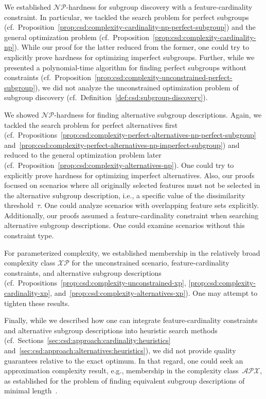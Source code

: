 \documentclass{article}
\theoremstyle{definition}
\begin{document}
We established $\mathcal{NP}$-hardness for subgroup discovery with a feature-cardinality constraint.
In particular, we tackled the search problem for perfect subgroups (cf.~Proposition~\ref{prop:csd:complexity-cardinality-np-perfect-subgroup}) and the general optimization problem (cf.~Proposition~\ref{prop:csd:complexity-cardinality-np}).
While our proof for the latter reduced from the former, one could try to explicitly prove hardness for optimizing imperfect subgroups.
Further, while we presented a polynomial-time algorithm for finding perfect subgroups without constraints (cf.~Proposition~\ref{prop:csd:complexity-unconstrained-perfect-subgroup}), we did not analyze the unconstrained optimization problem of subgroup discovery (cf.~Definition~\ref{def:csd:subgroup-discovery}).

We showed $\mathcal{NP}$-hardness for finding alternative subgroup descriptions.
Again, we tackled the search problem for perfect alternatives first (cf.~Propositions~\ref{prop:csd:complexity-perfect-alternatives-np-perfect-subgroup} and~\ref{prop:csd:complexity-perfect-alternatives-np-imperfect-subgroup}) and reduced to the general optimization problem later (cf.~Proposition~\ref{prop:csd:complexity-alternatives-np}).
One could try to explicitly prove hardness for optimizing imperfect alternatives.
Also, our proofs focused on scenarios where all originally selected features must not be selected in the alternative subgroup description, i.e., a specific value of the dissimilarity threshold~$\tau$.
One could analyze scenarios with overlapping feature sets explicitly.
Additionally, our proofs assumed a feature-cardinality constraint when searching alternative subgroup descriptions.
One could examine scenarios without this constraint type.

For parameterized complexity, we established membership in the relatively broad complexity class $\mathcal{XP}$ for the unconstrained scenario, feature-cardinality constraints, and alternative subgroup descriptions (cf.~Propositions~\ref{prop:csd:complexity-unconstrained-xp}, \ref{prop:csd:complexity-cardinality-xp}, and~\ref{prop:csd:complexity-alternatives-xp}).
One may attempt to tighten these results.

Finally, while we described how one can integrate feature-cardinality constraints and alternative subgroup descriptions into heuristic search methods (cf.~Sections~\ref{sec:csd:approach:cardinality:heuristics} and~\ref{sec:csd:approach:alternatives:heuristics}), we did not provide quality guarantees relative to the exact optimum.
In that regard, one could seek an approximation complexity result, e.g., membership in the complexity class~$\mathcal{APX}$, as established for the problem of finding equivalent subgroup descriptions of minimal length~\cite{boley2009non}.
\end{document}
